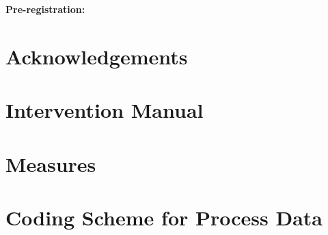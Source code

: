 \documentclass[11pt,a4paper]{article}
\begin{document}
\noindent\textbf{Pre-registration:} %

\section*{Acknowledgements}



\appendix

\section{Intervention Manual}
\label{app:manual}

\section{Measures}
\label{app:measures}

\section{Coding Scheme for Process Data}
\label{app:coding}
\end{document}

